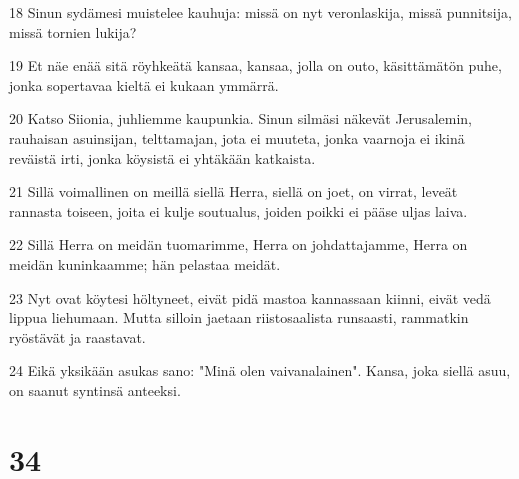 \par 18 Sinun sydämesi muistelee kauhuja: missä on nyt veronlaskija, missä punnitsija, missä tornien lukija?
\par 19 Et näe enää sitä röyhkeätä kansaa, kansaa, jolla on outo, käsittämätön puhe, jonka sopertavaa kieltä ei kukaan ymmärrä.
\par 20 Katso Siionia, juhliemme kaupunkia. Sinun silmäsi näkevät Jerusalemin, rauhaisan asuinsijan, telttamajan, jota ei muuteta, jonka vaarnoja ei ikinä reväistä irti, jonka köysistä ei yhtäkään katkaista.
\par 21 Sillä voimallinen on meillä siellä Herra, siellä on joet, on virrat, leveät rannasta toiseen, joita ei kulje soutualus, joiden poikki ei pääse uljas laiva.
\par 22 Sillä Herra on meidän tuomarimme, Herra on johdattajamme, Herra on meidän kuninkaamme; hän pelastaa meidät.
\par 23 Nyt ovat köytesi höltyneet, eivät pidä mastoa kannassaan kiinni, eivät vedä lippua liehumaan. Mutta silloin jaetaan riistosaalista runsaasti, rammatkin ryöstävät ja raastavat.
\par 24 Eikä yksikään asukas sano: "Minä olen vaivanalainen". Kansa, joka siellä asuu, on saanut syntinsä anteeksi.

\chapter{34}

